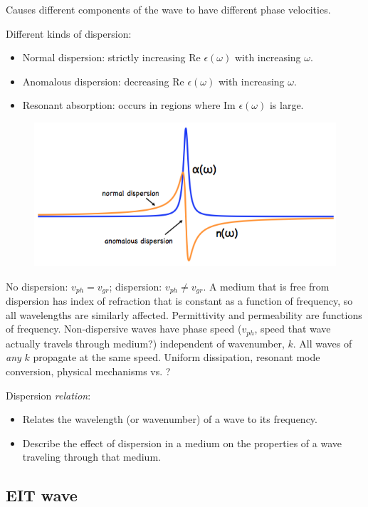 \documentclass{article}
\begin{document}
Causes different components of the wave to have different phase velocities.

Different kinds of dispersion:
\begin{itemize}
    \item Normal dispersion: strictly increasing Re ${\epsilon(\omega)}$ with
        increasing ${\omega}$.
    \item Anomalous dispersion: decreasing Re ${\epsilon(\omega)}$ with
        increasing ${\omega}$.
    \item Resonant absorption: occurs in regions where Im ${\epsilon(\omega)}$
        is large.
\end{itemize}

\begin{figure}[h]
    \centering
    \includegraphics[width=5in]{disp.png}
\end{figure}

No dispersion: ${v_{ph} = v_{gr}}$; dispersion: ${v_{ph} \neq v_{gr}}$.
A medium that is free from dispersion has index of refraction that is constant
as a function of frequency, so all wavelengths are similarly affected.
Permittivity and permeability are functions of frequency.
Non-dispersive waves have phase speed (${v_{ph}}$, speed that wave actually travels
through medium?) independent of wavenumber, ${k}$.
All waves of \emph{any} ${k}$ propagate at the same speed.
Uniform dissipation, resonant mode conversion, physical mechanisms vs. ?

Dispersion \emph{relation}:
\begin{itemize}
    \item Relates the wavelength (or wavenumber) of a wave to its
        frequency.
    \item Describe the effect of dispersion in a medium on the properties
        of a wave traveling through that medium.
\end{itemize}

\subsection{EIT wave}
\end{document}
